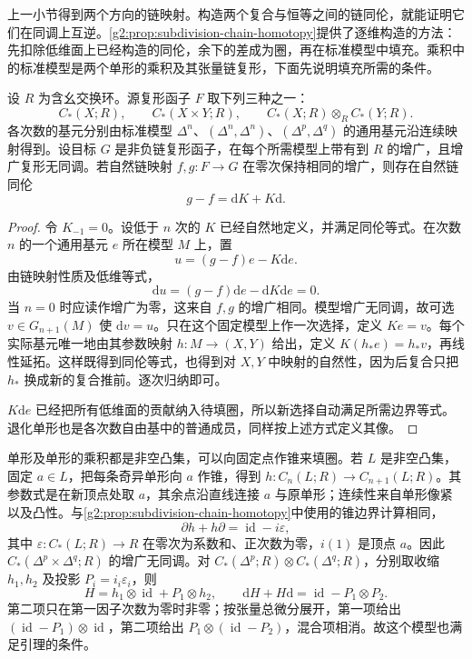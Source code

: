 上一小节得到两个方向的链映射。构造两个复合与恒等之间的链同伦，就能证明它们在同调上互逆。\cref{g2:prop:subdivision-chain-homotopy}提供了逐维构造的方法：先扣除低维面上已经构造的同伦，余下的差成为圈，再在标准模型中填充。乘积中的标准模型是两个单形的乘积及其张量链复形，下面先说明填充所需的条件。

\begin{lemma}\label{g2:lem:product-model-homotopy}
	设 \(R\) 为含幺交换环。源复形函子 \(F\) 取下列三种之一：
	\[
		C_*(X;R),\qquad
		C_*(X\times Y;R),\qquad
		C_*(X;R)\otimes_R C_*(Y;R).
	\]
	各次数的基元分别由标准模型 \(\Delta^n\)、\((\Delta^n,\Delta^n)\)、\((\Delta^p,\Delta^q)\) 的通用基元沿连续映射得到。设目标 \(G\) 是非负链复形函子，在每个所需模型上带有到 \(R\) 的增广，且增广复形无同调。若自然链映射 \(f,g:F\to G\) 在零次保持相同的增广，则存在自然链同伦
	\[
		g-f=\mathrm{d}K+K\mathrm{d}.
	\]
\end{lemma}
\begin{proof}
	令 \(K_{-1}=0\)。设低于 \(n\) 次的 \(K\) 已经自然地定义，并满足同伦等式。在次数 \(n\) 的一个通用基元 \(e\) 所在模型 \(M\) 上，置
	\[
		u=(g-f)e-K\mathrm{d}e.
	\]
	由链映射性质及低维等式，
	\[
		\mathrm{d}u=(g-f)\mathrm{d}e-\mathrm{d}K\mathrm{d}e=0.
	\]
	当 \(n=0\) 时应读作增广为零，这来自 \(f,g\) 的增广相同。模型增广无同调，故可选 \(v\in G_{n+1}(M)\) 使 \(\mathrm{d}v=u\)。只在这个固定模型上作一次选择，定义 \(Ke=v\)。每个实际基元唯一地由其参数映射 \(h:M\to(X,Y)\) 给出，定义 \(K(h_*e)=h_*v\)，再线性延拓。这样既得到同伦等式，也得到对 \(X,Y\) 中映射的自然性，因为后复合只把 \(h_*\) 换成新的复合推前。逐次归纳即可。

	\(K\mathrm{d}e\) 已经把所有低维面的贡献纳入待填圈，所以新选择自动满足所需边界等式。退化单形也是各次数自由基中的普通成员，同样按上述方式定义其像。
\end{proof}

单形及单形的乘积都是非空凸集，可以向固定点作锥来填圈。若 \(L\) 是非空凸集，固定 \(a\in L\)，把每条奇异单形向 \(a\) 作锥，得到 \(h:C_n(L;R)\to C_{n+1}(L;R)\)。其参数式是在新顶点处取 \(a\)，其余点沿直线连接 \(a\) 与原单形；连续性来自单形像紧以及凸性。与\cref{g2:prop:subdivision-chain-homotopy}中使用的锥边界计算相同，
\[
	\partial h+h\partial=\operatorname{id}-i\varepsilon,
\]
其中 \(\varepsilon:C_*(L;R)\to R\) 在零次为系数和、正次数为零，\(i(1)\) 是顶点 \(a\)。因此 \(C_*(\Delta^p\times\Delta^q;R)\) 的增广无同调。对 \(C_*(\Delta^p;R)\otimes C_*(\Delta^q;R)\)，分别取收缩 \(h_1,h_2\) 及投影 \(P_i=i_i\varepsilon_i\)，则
\[
	H=h_1\otimes\operatorname{id}+P_1\otimes h_2,
	\qquad
	\mathrm{d}H+H\mathrm{d}
	=\operatorname{id}-P_1\otimes P_2.
\]
第二项只在第一因子次数为零时非零；按张量总微分展开，第一项给出 \((\operatorname{id}-P_1)\otimes\operatorname{id}\)，第二项给出 \(P_1\otimes(\operatorname{id}-P_2)\)，混合项相消。故这个模型也满足引理的条件。

